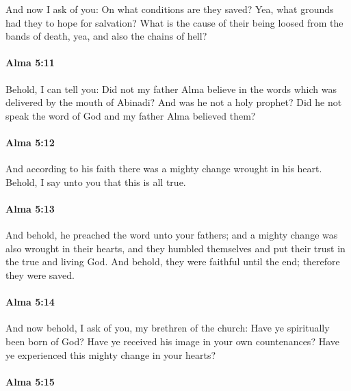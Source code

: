 			And now I ask of you:
			On what conditions are they saved?
			Yea, what grounds had they to hope for salvation?
			What is the cause of their being loosed from the bands of death,
			yea, and also the chains of hell?

		\paragraph{Alma 5:11} %
			\label{ALMA-5-11}

			Behold, I can tell you:
			Did not my father Alma believe in the words
			which was delivered by the mouth of Abinadi?
			And was he not a holy prophet?
			Did he not speak the word of God and my father Alma believed them?

		\paragraph{Alma 5:12} %
			\label{ALMA-5-12}

			And according to his faith there was a mighty change wrought in his heart.
			Behold, I say unto you that this is all true.

		\paragraph{Alma 5:13} %
			\label{ALMA-5-13}

			And behold, he preached the word unto your fathers;
			and a mighty change was also wrought in their hearts,
			and they humbled themselves and put their trust in the true and living God.
			And behold, they were faithful until the end;
			therefore they were saved.

		\paragraph{Alma 5:14} %
			\label{ALMA-5-14}

			And now behold, I ask of you, my brethren of the church:
			Have ye spiritually been born of God?
			Have ye received his image in your own countenances?
			Have ye experienced this mighty change in your hearts?

		\paragraph{Alma 5:15} %
			\label{ALMA-5-15}

